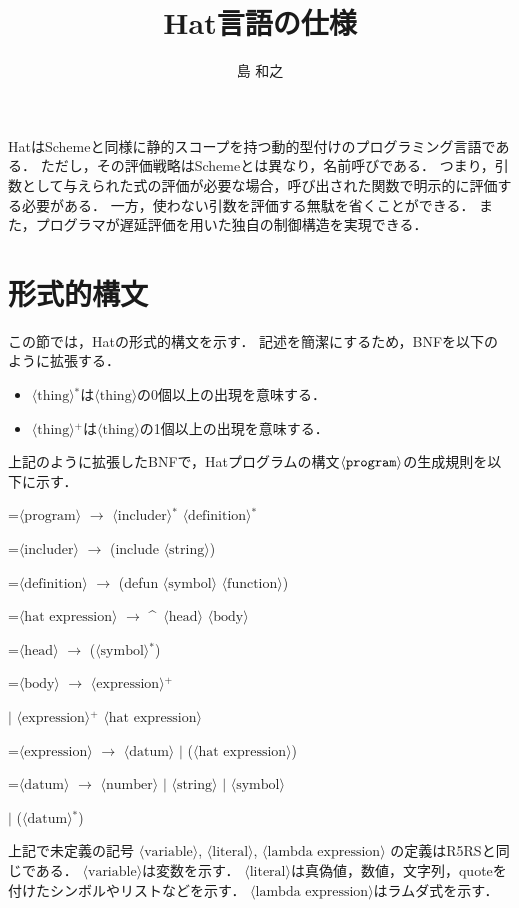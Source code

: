 \documentclass[twocolumn]{jarticle}
\def\hat{\mbox{\^{ }}}
\def\|{ $|$ \allowbreak}
\newcommand{\NT}[1]{\ensuremath{\langle\mbox{#1}\rangle}\allowbreak}
\newcommand{\lrto}{ \ensuremath{\rightarrow} \allowbreak}
\newenvironment{hang}[1][\parindent]
  {\def\item{\par\hangindent=#1\noindent}}
  {\par}
\begin{document}
\title{Hat言語の仕様}
\author{島 和之}
\maketitle

HatはSchemeと同様に静的スコープを持つ動的型付けのプログラミング言語である．
ただし，その評価戦略はSchemeとは異なり，名前呼びである．
つまり，引数として与えられた式の評価が必要な場合，呼び出された関数で明示的に評価する必要がある．
一方，使わない引数を評価する無駄を省くことができる．
また，プログラマが遅延評価を用いた独自の制御構造を実現できる．

\section{形式的構文}

この節では，Hatの形式的構文を示す．
記述を簡潔にするため，BNFを以下のように拡張する．
\begin{itemize}
\item\NT{thing}$^*$は\NT{thing}の0個以上の出現を意味する．
\item\NT{thing}$^+$は\NT{thing}の1個以上の出現を意味する．
\end{itemize}
上記のように拡張したBNFで，Hatプログラムの構文\NT{\tt program}の生成規則を以下に示す．
\begin{hang}\tt %
\item\NT{program}\lrto
  \NT{includer}$^*$ \NT{definition}$^*$
\item\NT{includer}\lrto
  (include \NT{string})
\item\NT{definition}\lrto
  (defun \NT{symbol} \NT{function})
\item\NT{hat expression}\lrto
  \hat\ \NT{head} \NT{body}
\item\NT{head}\lrto
  (\NT{symbol}$^*$)
\item\NT{body}\lrto
  \NT{expression}$^+$ \par
  \| \NT{expression}$^+$ \NT{hat expression}
\item\NT{expression}\lrto
  \NT{datum} \| (\NT{hat expression})
\item\NT{datum}\lrto
  \NT{number} \| \NT{string} \| \NT{symbol} \par
  \| (\NT{datum}$^*$)
\end{hang}

上記で未定義の記号 \NT{variable}, \NT{literal}, \NT{lambda expression} の定義はR5RSと同じである．
\NT{variable}は変数を示す．
\NT{literal}は真偽値，数値，文字列，quoteを付けたシンボルやリストなどを示す．
\NT{lambda expression}はラムダ式を示す．
\end{document}
